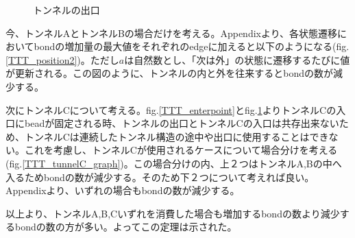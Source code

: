 \documentclass[a4,dvipdfmx,11pt]{article}
\theoremstyle{definition}
\begin{document}
\begin{figure}[h]
  \begin{center}
    \caption{トンネルの出口}
    \label{TTT_exitpoint}
  \end{center}
\end{figure}

今、トンネルAとトンネルBの場合だけを考える。Appendixより、各状態遷移においてbondの増加量の最大値をそれぞれのedgeに加えると以下のようになる(fig.\ref{TTT_position2})。ただし$a$は自然数とし、「次は外」の状態に遷移するたびに値が更新される。この図のように、トンネルの内と外を往来するとbondの数が減少する。


次にトンネルCについて考える。fig.\ref{TTT_enterpoint}とfig.\ref{TTT_exitpoint}よりトンネルCの入口にbeadが固定される時、トンネルの出口とトンネルCの入口は共存出来ないため、トンネルCは連続したトンネル構造の途中や出口に使用することはできない。これを考慮し、トンネルCが使用されるケースについて場合分けを考える(fig.\ref{TTT_tunnelC_graph})。この場合分けの内、上２つはトンネルA,Bの中へ入るためbondの数が減少する。そのため下２つについて考えれば良い。Appendixより、いずれの場合もbondの数が減少する。



以上より、トンネルA,B,Cいずれを消費した場合も増加するbondの数より減少するbondの数の方が多い。よってこの定理は示された。
\end{document}
